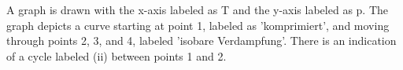 A graph is drawn with the x-axis labeled as T and the y-axis labeled as p. The graph depicts a curve starting at point 1, labeled as 'komprimiert', and moving through points 2, 3, and 4, labeled 'isobare Verdampfung'. There is an indication of a cycle labeled (ii) between points 1 and 2.